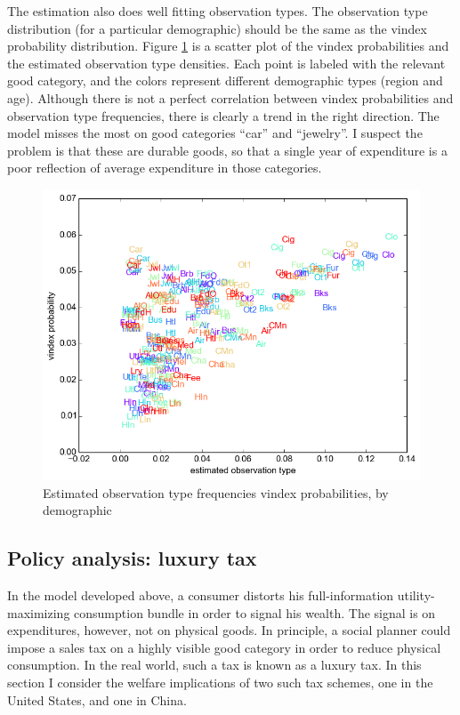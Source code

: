 The estimation also does well fitting observation types.
The observation type distribution (for a particular demographic) should be the same as the vindex probability distribution.
Figure \ref{fig:vinmatch} is a scatter plot of the vindex probabilities and the estimated observation type densities.  Each point is labeled with the relevant good category, and the colors represent different demographic types (region and age). Although there is not a perfect correlation between vindex probabilities and observation type frequencies, there is clearly a trend in the right direction.  The model misses the most on good categories ``car'' and ``jewelry''.  I suspect the problem is that these are durable goods, so that a single year of expenditure is a poor reflection of average expenditure in those categories.
\begin{figure}
    \centering
	\includegraphics[scale=.8]{pics/obs_vin_scat.png}
    \caption{Estimated observation type frequencies vindex probabilities, by demographic}
    \label{fig:vinmatch}
\end{figure}

\subsection{Policy analysis: luxury tax}

In the model developed above, a consumer distorts his full-information utility-maximizing consumption bundle in order to signal his wealth.  The signal is on expenditures, however, not on physical goods.  In principle, a social planner could impose a sales tax on a highly visible good category in order to reduce physical consumption.  In the real world, such a tax is known as a luxury tax.  In this section I consider the welfare implications of two such tax schemes, one in the United States, and one in China.

